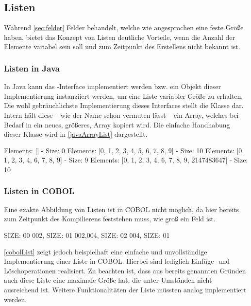 \subsection{Listen}\label{lists}
Während \autoref{sec:felder} Felder behandelt, welche wie angesprochen eine feste Größe haben, bietet das Konzept von Listen deutliche Vorteile, wenn die Anzahl der Elemente variabel sein soll und zum Zeitpunkt des Erstellens nicht bekannt ist.
\subsubsection*{Listen in Java}
In Java kann das -Interface implementiert werden bzw. ein Objekt dieser Implementierung instanziiert werden, um eine Liste variabler Größe zu erhalten. Die wohl gebräuchlichste Implementierung dieses Interfaces stellt die Klasse  dar. Intern hält diese -- wie der Name schon vermuten lässt -- ein Array, welches bei Bedarf in ein neues, größeres, Array kopiert wird. Die einfache Handhabung dieser Klasse wird in  \autoref{javaArrayList} dargestellt.
\begin{shellwindow}
Elements: [] - Size: 0
Elements: [0, 1, 2, 3, 4, 5, 6, 7, 8, 9] - Size: 10
Elements: [0, 1, 2, 3, 4, 6, 7, 8, 9] - Size: 9
Elements: [0, 1, 2, 3, 4, 6, 7, 8, 9, 2147483647] - Size: 10
\end{shellwindow}
\subsubsection*{Listen in COBOL}
Eine exakte Abbildung von Listen ist in COBOL nicht möglich, da hier bereits zum Zeitpunkt des Kompilierens feststehen muss, wie groß ein Feld ist.
\begin{shellwindow}
 SIZE: 00
002, SIZE: 01
002,004, SIZE: 02
004, SIZE: 01
\end{shellwindow}
\autoref{cobolList} zeigt jedoch beispielhaft eine einfache und unvollständige Implementierung einer Liste in COBOL. Hierbei sind lediglich Einfüge- und Löschoperationen realisiert. Zu beachten ist, dass aus bereits genannten Gründen auch diese Liste eine maximale Größe hat, die unter Umständen nicht ausreichend ist. Weitere Funktionalitäten der Liste müssten analog implementiert werden.